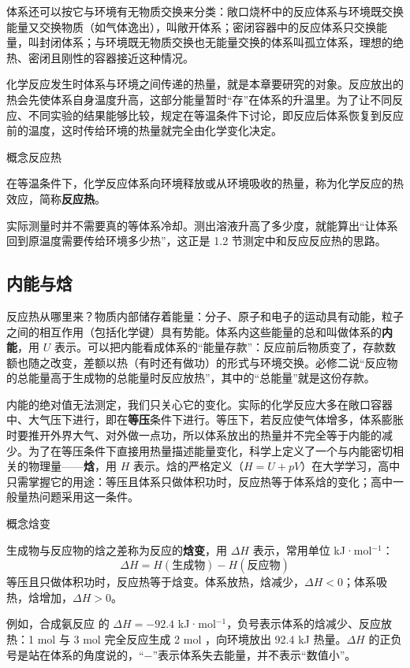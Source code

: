 \documentclass[UTF8,a4paper,zihao=5,oneside,openany,fontset=none]{ctexbook}
\def\heiti{\CJKfamily{zhhei}}
\newcommand{\textheading}[2]{\par\addvspace{.6em}\Needspace{4\baselineskip}\noindent
 {\heiti\if\relax\detokenize{#2}\relax #1\else #2\fi}\par\nobreak\smallskip\nobreak\color{black}\ignorespaces}
\newenvironment{gainian}[1][]{\textheading{概念}{#1}}{\par\smallskip}
\begin{document}
体系还可以按它与环境有无物质交换来分类：敞口烧杯中的反应体系与环境既交换能量又交换物质（如气体逸出），叫敞开体系；密闭容器中的反应体系只交换能量，叫封闭体系；与环境既无物质交换也无能量交换的体系叫孤立体系，理想的绝热、密闭且刚性的容器接近这种情况。

化学反应发生时体系与环境之间传递的热量，就是本章要研究的对象。反应放出的热会先使体系自身温度升高，这部分能量暂时“存”在体系的升温里。为了让不同反应、不同实验的结果能够比较，规定在等温条件下讨论，即反应后体系恢复到反应前的温度，这时传给环境的热量就完全由化学变化决定。

\begin{gainian}[反应热]
在等温条件下，化学反应体系向环境释放或从环境吸收的热量，称为化学反应的热效应，简称\textbf{反应热}。
\end{gainian}

实际测量时并不需要真的等体系冷却。测出溶液升高了多少度，就能算出“让体系回到原温度需要传给环境多少热”，这正是 1.2 节测定中和反应反应热的思路。

\subsection{内能与焓}
反应热从哪里来？物质内部储存着能量：分子、原子和电子的运动具有动能，粒子之间的相互作用（包括化学键）具有势能。体系内这些能量的总和叫做体系的\textbf{内能}，用 $U$ 表示。可以把内能看成体系的“能量存款”：反应前后物质变了，存款数额也随之改变，差额以热（有时还有做功）的形式与环境交换。必修二说“反应物的总能量高于生成物的总能量时反应放热”，其中的“总能量”就是这份存款。

内能的绝对值无法测定，我们只关心它的变化。实际的化学反应大多在敞口容器中、大气压下进行，即在\textbf{等压}条件下进行。等压下，若反应使气体增多，体系膨胀时要推开外界大气、对外做一点功，所以体系放出的热量并不完全等于内能的减少。为了在等压条件下直接用热量描述能量变化，科学上定义了一个与内能密切相关的物理量——\textbf{焓}，用 $H$ 表示。焓的严格定义（$H=U+pV$）在大学学习，高中只需掌握它的用途：等压且体系只做体积功时，反应热等于体系焓的变化；高中一般量热问题采用这一条件。

\begin{gainian}[焓变]
生成物与反应物的焓之差称为反应的\textbf{焓变}，用 $\Delta H$ 表示，常用单位 kJ·mol$^{-1}$：
\[\Delta H=H(\text{生成物})-H(\text{反应物})\]
等压且只做体积功时，反应热等于焓变。体系放热，焓减少，$\Delta H<0$；体系吸热，焓增加，$\Delta H>0$。
\end{gainian}

例如，合成氨反应  的 $\Delta H=-92.4$ kJ·mol$^{-1}$，负号表示体系的焓减少、反应放热：1 mol  与 3 mol  完全反应生成 2 mol ，向环境放出 92.4 kJ 热量。$\Delta H$ 的正负号是站在体系的角度说的，“$-$”表示体系失去能量，并不表示“数值小”。
\end{document}
